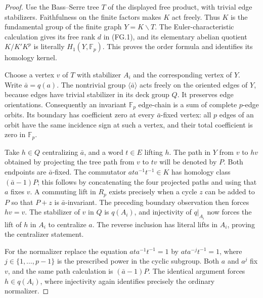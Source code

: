 \begin{proof}
Use the Bass--Serre tree $T$ of the displayed free product, with
trivial edge stabilizers.  Faithfulness on the finite factors makes
$K$ act freely.  Thus $K$ is the fundamental group of the finite
graph $Y=K\backslash T$.  The Euler-characteristic calculation gives
its free rank $d$ in (FG.1), and its elementary abelian quotient
$K/K'K^p$ is literally $H_1(Y,\mathbb F_p)$.  This proves the order
formula and identifies its homology kernel.

Choose a vertex $v$ of $T$ with stabilizer $A_i$ and the corresponding
vertex of $Y$.  Write $\bar a=q(a)$.  The nontrivial group
$\langle\bar a\rangle$ acts freely on the oriented edges of $Y$,
because edges have trivial stabilizer in its deck group $Q$.
It preserves edge orientations.  Consequently an invariant
$\mathbb F_p$ edge-chain is a sum of complete $p$-edge orbits.
Its boundary has coefficient zero at every $\bar a$-fixed vertex:
all $p$ edges of an orbit have the same incidence sign at such
a vertex, and their total coefficient is zero in $\mathbb F_p$.

Take $h\in Q$ centralizing $\bar a$, and a word $t\in E$ lifting
$h$.  The path in $Y$ from $v$ to $hv$ obtained by projecting the
tree path from $v$ to $tv$ will be denoted by $P$.
Both endpoints are $\bar a$-fixed.  The commutator
$ata^{-1}t^{-1}\in K$ has homology class
$(\bar a-1)P$; this follows by concatenating the four projected
paths and using that $a$ fixes $v$.
A commuting lift in $R_p$ exists precisely when a cycle $z$ can
be added to $P$ so that $P+z$ is $\bar a$-invariant.
The preceding boundary observation then forces $hv=v$.
The stabilizer of $v$ in $Q$ is $q(A_i)$, and injectivity of
$q|_{A_i}$ now forces the lift of $h$ in $A_i$ to centralize $a$.
The reverse inclusion has literal lifts in $A_i$, proving the
centralizer statement.

For the normalizer replace the equation $ata^{-1}t^{-1}=1$ by
$at a^{-j}t^{-1}=1$, where $j\in\{1,\ldots,p-1\}$ is the
prescribed power in the cyclic subgroup.  Both $a$ and $a^j$ fix
$v$, and the same path calculation is $(\bar a-1)P$.
The identical argument forces $h\in q(A_i)$, where injectivity
again identifies precisely the ordinary normalizer.


\end{proof}

